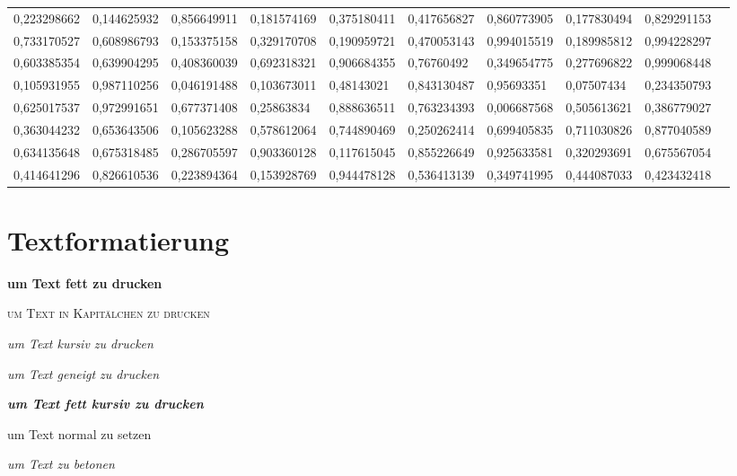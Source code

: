 \documentclass[12pt,ngerman,parskip=half]{scrartcl}
\begin{document}
\begin{landscape}
\begin{table}
\begin{center}
\begin{tabular}{llllllllll}
0,223298662	&	0,144625932	&	0,856649911	&	0,181574169	&	0,375180411	&	0,417656827	&	0,860773905	&	0,177830494	&	0,829291153	\\
0,733170527	&	0,608986793	&	0,153375158	&	0,329170708	&	0,190959721	&	0,470053143	&	0,994015519	&	0,189985812	&	0,994228297	\\
0,603385354	&	0,639904295	&	0,408360039	&	0,692318321	&	0,906684355	&	0,76760492	&	0,349654775	&	0,277696822	&	0,999068448	\\
0,105931955	&	0,987110256	&	0,046191488	&	0,103673011	&	0,48143021	&	0,843130487	&	0,95693351	&	0,07507434	&	0,234350793	\\
0,625017537	&	0,972991651	&	0,677371408	&	0,25863834	&	0,888636511	&	0,763234393	&	0,006687568	&	0,505613621	&	0,386779027	\\
0,363044232	&	0,653643506	&	0,105623288	&	0,578612064	&	0,744890469	&	0,250262414	&	0,699405835	&	0,711030826	&	0,877040589	\\
0,634135648	&	0,675318485	&	0,286705597	&	0,903360128	&	0,117615045	&	0,855226649	&	0,925633581	&	0,320293691	&	0,675567054	\\
0,414641296	&	0,826610536	&	0,223894364	&	0,153928769	&	0,944478128	&	0,536413139	&	0,349741995	&	0,444087033	&	0,423432418	\\ \bottomrule 
\end{tabular} 
\end{center}
\end{table}
\end{landscape}

\section{Textformatierung}

\textbf{um Text fett zu drucken}

\textsc{um Text in Kapitälchen zu drucken}

\textit{um Text kursiv zu drucken}

\textsl{um Text geneigt zu drucken}

\textit{\textbf{um Text fett kursiv zu drucken}}

\textup{um Text normal zu setzen}

\emph{um Text zu betonen}

\end{document}
